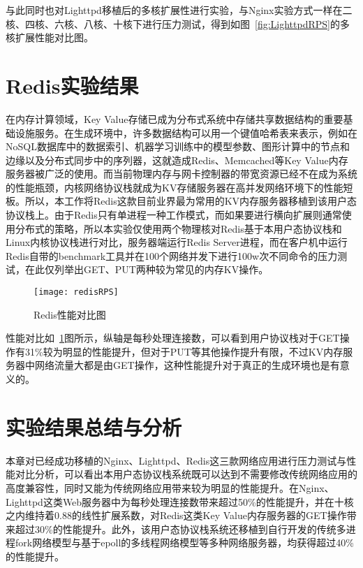 与此同时也对Lighttpd移植后的多核扩展性进行实验，与Nginx实验方式一样在二核、四核、六核、八核、十核下进行压力测试，得到如图~\ref{fig:LighttpdRPS}的多核扩展性能对比图。

\section{Redis实验结果}

在内存计算领域，Key Value存储已成为分布式系统中存储共享数据结构的重要基础设施服务。在生成环境中，许多数据结构可以用一个键值哈希表来表示，例如在NoSQL数据库中的数据索引、机器学习训练中的模型参数、图形计算中的节点和边缘以及分布式同步中的序列器，这就造成Redis、Memcached等Key Value内存服务器被广泛的使用。而当前物理内存与网卡控制器的带宽资源已经不在成为系统的性能瓶颈，内核网络协议栈就成为KV存储服务器在高并发网络环境下的性能短板。所以，本工作将Redis这款目前业界最为常用的KV内存服务器移植到该用户态协议栈上。由于Redis只有单进程一种工作模式，而如果要进行横向扩展则通常使用分布式的策略，所以本实验仅使用两个物理核对Redis基于本用户态协议栈和Linux内核协议栈进行对比，服务器端运行Redis Server进程，而在客户机中运行Redis自带的benchmark工具并在100个网络并发下进行100w次不同命令的压力测试，在此仅列举出GET、PUT两种较为常见的内存KV操作。

\vspace{-10pt}
\begin{figure}[H] %
  \centering
  \texttt{[image: redisRPS]}
  \caption{Redis性能对比图}
  \label{fig:redisRPS}
\end{figure}
\vspace{-10pt}

性能对比如~\ref{fig:redisRPS}图所示，纵轴是每秒处理连接数，可以看到用户协议栈对于GET操作有31\%较为明显的性能提升，但对于PUT等其他操作提升有限，不过KV内存服务器中网络流量大都是由GET操作，这种性能提升对于真正的生成环境也是有意义的。

\section{实验结果总结与分析}

本章对已经成功移植的Nginx、Lighttpd、Redis这三款网络应用进行压力测试与性能对比分析，可以看出本用户态协议栈系统既可以达到不需要修改传统网络应用的高度兼容性，同时又能为传统网络应用带来较为明显的性能提升。在Nginx、Lighttpd这类Web服务器中为每秒处理连接数带来超过50\%的性能提升，并在十核之内维持着0.88的线性扩展系数，对Redis这类Key Value内存服务器的GET操作带来超过30\%的性能提升。此外，该用户态协议栈系统还移植到自行开发的传统多进程fork网络模型与基于epoll的多线程网络模型等多种网络服务器，均获得超过40\%的性能提升。